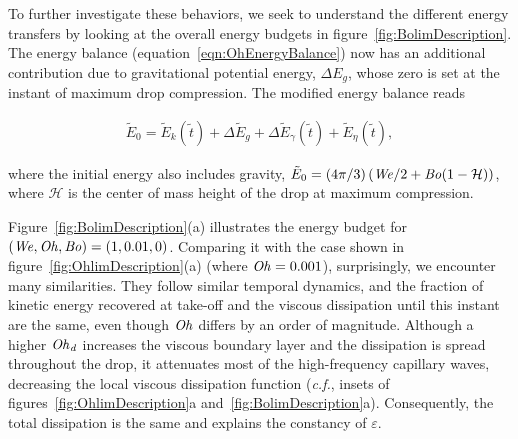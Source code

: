 To further investigate these behaviors, we seek to understand the different energy transfers by looking at the overall energy budgets in figure~\ref{fig:BolimDescription}. The energy balance (equation~\eqref{eqn:OhEnergyBalance}) now has an additional contribution due to gravitational potential energy, $\Delta E_g$, whose zero is set at the instant of maximum drop compression. The modified energy balance reads

\begin{align}
	\label{eqn:BoEnergyBalance}
	\tilde{E}_0 = \tilde{E}_k(\tilde{t}) + \Delta\tilde{E}_g + \Delta\tilde{E}_\gamma(\tilde{t}) + \tilde{E}_\eta(\tilde{t}),
\end{align}

\noindent where the initial energy also includes gravity, $\tilde{E}_0 = (4\pi/3)\left(\mathit{We}/2 + \mathit{Bo}(1-\mathcal{H})\right)$, where $\mathcal{H}$ is the center of mass height of the drop at maximum compression. 

Figure~\ref{fig:BolimDescription}(a) illustrates the energy budget for $(\mathit{We}, \mathit{Oh}, \mathit{Bo}) = (1, 0.01, 0)$. Comparing it with the case shown in figure~\ref{fig:OhlimDescription}(a) (where $\mathit{Oh} = 0.001$), surprisingly, we encounter many similarities. They follow similar temporal dynamics, and the fraction of kinetic energy recovered at take-off and the viscous dissipation until this instant are the same, even though $\mathit{Oh}$ differs by an order of magnitude. Although a higher $\mathit{Oh}_\mathit{d}$ increases the viscous boundary layer and the dissipation is spread throughout the drop, it attenuates most of the high-frequency capillary waves, decreasing the local viscous dissipation function (\emph{c.f.}, insets of figures~\ref{fig:OhlimDescription}a and~\ref{fig:BolimDescription}a). Consequently, the total dissipation is the same and explains the constancy of $\varepsilon$. 

